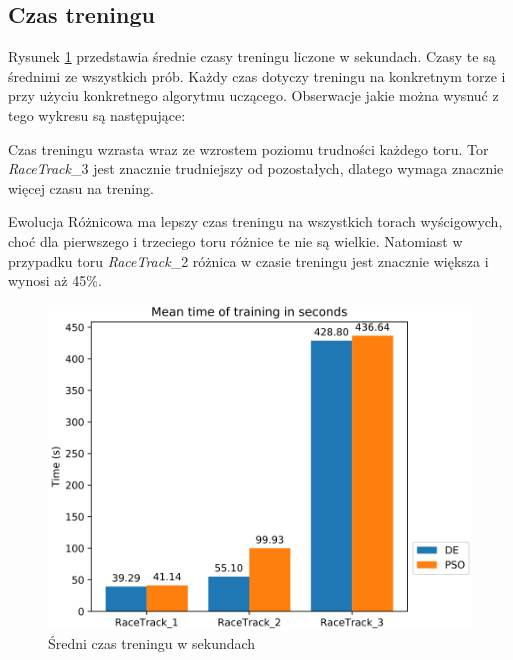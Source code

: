 \vspace{2cm}
\subsection{Czas treningu}
Rysunek \ref{MeanTimeSeconds} przedstawia średnie czasy treningu liczone w sekundach. Czasy te są średnimi ze wszystkich prób. Każdy czas dotyczy treningu na konkretnym torze i przy użyciu konkretnego algorytmu uczącego. Obserwacje jakie można wysnuć z tego wykresu są następujące:
\begin{enumerate*}
\item Czas treningu wzrasta wraz ze wzrostem poziomu trudności każdego toru. Tor \textit{RaceTrack}\_3 jest znacznie trudniejszy od pozostałych, dlatego wymaga znacznie więcej czasu na trening.
\item Ewolucja Różnicowa ma lepszy czas treningu na wszystkich torach wyścigowych, choć dla pierwszego i trzeciego toru różnice te nie są wielkie. Natomiast w przypadku toru \textit{RaceTrack}\_2 różnica w czasie treningu jest znacznie większa i wynosi aż 45\%.
\end{enumerate*}
\begin{figure}[H]
\centering
\includegraphics[width=13cm]{resources/figures/train_time_seconds.png}
\caption{Średni czas treningu w sekundach}
\label{MeanTimeSeconds}
\end{figure}
\vspace{0.4cm}
